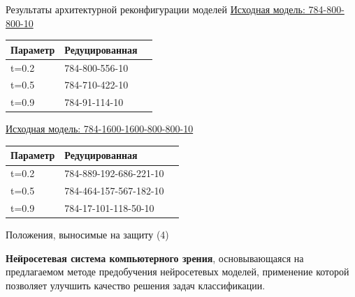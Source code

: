 \documentclass[10pt]{beamer}
\begin{document}
        \begin{frame}{Результаты архитектурной реконфигурации моделей}
            \underline{Исходная модель: 784-800-800-10}
            \begin{table} [!h]
              \small
                \centering
                \begin{tabular}{| p{2cm} | p{4cm} | p{4cm} |}
                \hline
                    \textbf{Параметр} & \textbf{Редуцированная}\\
                \hline
                t=0.2 & 784-800-556-10\\
                \hline
                t=0.5 & 784-710-422-10\\
                \hline
                t=0.9 & 784-91-114-10\\
                \hline
                \end{tabular}
                \end{table}

                \underline{Исходная модель: 784-1600-1600-800-800-10}
              \begin{table} [!h]
              \small
                \centering
                \begin{tabular}{| p{2cm} | p{4cm} | p{4cm} |}
                \hline
                    \textbf{Параметр} &  \textbf{Редуцированная}\\
                \hline
                t=0.2 & 784-889-192-686-221-10\\
                \hline
                t=0.5 & 784-464-157-567-182-10\\
                \hline
                t=0.9 & 784-17-101-118-50-10\\
                \hline
                \end{tabular}
            \end{table}
        \end{frame}

        \begin{frame}{Положения, выносимые на защиту (4)}
            \begin{block}{4}
                \large
                \textbf{Нейросетевая система компьютерного зрения}, основывающаяся на предлагаемом методе предобучения нейросетевых моделей, применение которой позволяет улучшить качество решения задач классификации. 
            \end{block}
        \end{frame}
\end{document}
